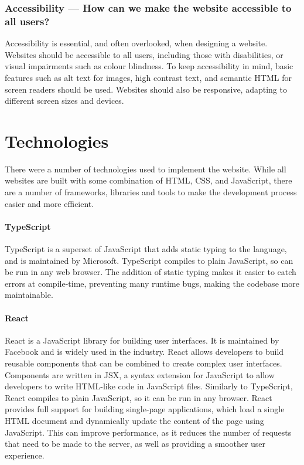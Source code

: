 \documentclass[../main.tex]{subfiles}
\begin{document}
            \subsubsection{Accessibility — How can we make the website accessible to all users?}
                Accessibility is essential, and often overlooked, when designing a website.
                Websites should be accessible to all users, including those with disabilities,
                    or visual impairments such as colour blindness.
                To keep accessibility in mind, basic features such as alt text for images, high
                    contrast text, and semantic HTML for screen readers should be used.
                Websites should also be responsive, adapting to different screen sizes and
                    devices.

    \section{Technologies}
        There were a number of technologies used to implement the website.
        While all websites are built with some combination of HTML, CSS, and
            JavaScript, there are a number of frameworks, libraries and tools to make the
            development process easier and more efficient.

        \paragraph*{TypeScript}
            TypeScript is a superset of JavaScript that adds static typing to the language,
                and is maintained by Microsoft.
            TypeScript compiles to plain JavaScript, so can be run in any web browser.
            The addition of static typing makes it easier to catch errors at compile-time,
                preventing many runtime bugs, making the codebase more maintainable.

        \paragraph*{React}
            React is a JavaScript library for building user interfaces.
            It is maintained by Facebook and is widely used in the industry.
            React allows developers to build reusable components that can be combined to
                create complex user interfaces.
            Components are written in JSX, a syntax extension for JavaScript to allow
                developers to write HTML-like code in JavaScript files.
            Similarly to TypeScript, React compiles to plain JavaScript, so it can be run
                in any browser.
            React provides full support for building single-page applications, which load a
                single HTML document and dynamically update the content of the page using
                JavaScript.
            This can improve performance, as it reduces the number of requests that need to
                be made to the server, as well as providing a smoother user experience.
\end{document}
